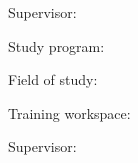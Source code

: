 


Supervisor: \mySupervisor

\medskip{}
\myDate


\newpage
\thispagestyle{empty}
\mbox{}






Study program: \myStudyProgram

Field of study: \myDegreeCourse

Training workspace: \myInstitute

Supervisor: \mySupervisor

\medskip{}

\myDate






